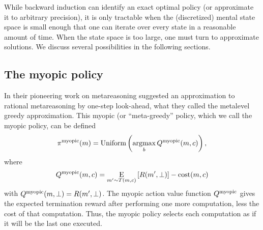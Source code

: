 


\separator

While backward induction can identify an exact optimal policy (or approximate it to arbitrary precision), it is only tractable when the (discretized) mental state space is small enough that one can iterate over every state in a reasonable amount of time. When the state space is too large, one must turn to approximate solutions. We discuss several possibilities in the following sections.

\subsection{The myopic policy}

In their pioneering work on metareasoning \citet{russell1991principles} suggested an approximation to rational metareasoning by one-step look-ahead, what they called the metalevel greedy approximation. This myopic (or ``meta-greedy'' policy, which we call the myopic policy, can be defined
\begin{equation}
  \pi^{\mathrm{myopic}}(m) = \text{Uniform}\left(\operatorname*{argmax}_b Q^{\mathrm{myopic}}(m, c)\right),
\end{equation}
where
\begin{equation}
Q^{\mathrm{myopic}}(m, c) = \operatorname*{E}_{m' \sim T(m, c)}\left[ 
  R(m', \bot)
\right] - \text{cost}(m, c)
\end{equation}
with $Q^{\mathrm{myopic}}(m, \bot) = R(m', \bot)$. The myopic action value function $Q^{\mathrm{myopic}}$ gives the expected termination reward after performing one more computation, less the cost of that computation. Thus, the myopic policy selects each computation as if it will be the last one executed.

